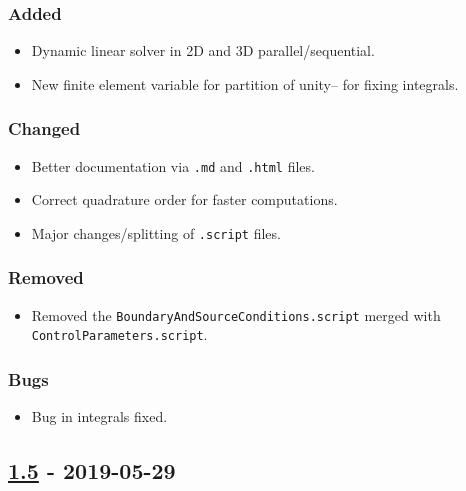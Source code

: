 \subsubsection{Added}\label{added-6}

\begin{itemize}
\tightlist
\item
  Dynamic linear solver in 2D and 3D parallel/sequential.
\item
  New finite element variable for partition of unity-- for fixing
  integrals.
\end{itemize}

\subsubsection{Changed}\label{changed-6}

\begin{itemize}
\tightlist
\item
  Better documentation via \lstinline!.md! and \lstinline!.html! files.
\item
  Correct quadrature order for faster computations.
\item
  Major changes/splitting of \lstinline!.script! files.
\end{itemize}

\subsubsection{Removed}\label{removed-2}

\begin{itemize}
\tightlist
\item
  Removed the \lstinline!BoundaryAndSourceConditions.script! merged with
  \lstinline!ControlParameters.script!.
\end{itemize}

\subsubsection{Bugs}\label{bugs}

\begin{itemize}
\tightlist
\item
  Bug in integrals fixed.
\end{itemize}

\subsection{\texorpdfstring{\href{https://gitlab.com/PsdSolver/psd_sources/-/tree/v1.5}{1.5}
- 2019-05-29}{1.5 - 2019-05-29}}\label{section-6}

